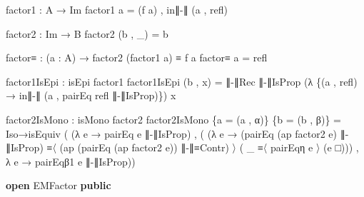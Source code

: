 \documentclass[
  11pt,
  oneside,
  article]{memoir}
\newenvironment{Shaded}{}{}
\newcommand{\KeywordTok}[1]{\textcolor[rgb]{0.00,0.44,0.13}{\textbf{#1}}}
\newcommand{\NormalTok}[1]{#1}
\newcommand{\OtherTok}[1]{\textcolor[rgb]{0.00,0.44,0.13}{#1}}
\theoremstyle{definition}
\theoremstyle{plain}
\newcommand{\0}{\textsf{0}}
\newcommand{\1}{\tn{\textsf{1}}}
\begin{document}
\begin{Shaded}
\begin{Highlighting}[]
\NormalTok{    factor1 }\OtherTok{:}\NormalTok{ A }\OtherTok{→}\NormalTok{ Im}
\NormalTok{    factor1 a }\OtherTok{=} \OtherTok{(}\NormalTok{f a}\OtherTok{)}\NormalTok{ , in∥{-}∥ }\OtherTok{(}\NormalTok{a , refl}\OtherTok{)}

\NormalTok{    factor2 }\OtherTok{:}\NormalTok{ Im }\OtherTok{→}\NormalTok{ B}
\NormalTok{    factor2 }\OtherTok{(}\NormalTok{b , }\OtherTok{\_)} \OtherTok{=}\NormalTok{ b}

\NormalTok{    factor≡ }\OtherTok{:} \OtherTok{(}\NormalTok{a }\OtherTok{:}\NormalTok{ A}\OtherTok{)} \OtherTok{→}\NormalTok{ factor2 }\OtherTok{(}\NormalTok{factor1 a}\OtherTok{)}\NormalTok{ ≡ f a}
\NormalTok{    factor≡ a }\OtherTok{=}\NormalTok{ refl}

\NormalTok{    factor1IsEpi }\OtherTok{:}\NormalTok{ isEpi factor1}
\NormalTok{    factor1IsEpi }\OtherTok{(}\NormalTok{b , x}\OtherTok{)} \OtherTok{=} 
\NormalTok{        ∥{-}∥Rec ∥{-}∥IsProp }
              \OtherTok{(λ} \OtherTok{\{(}\NormalTok{a , refl}\OtherTok{)} \OtherTok{→}\NormalTok{ in∥{-}∥ }\OtherTok{(}\NormalTok{a , pairEq refl ∥{-}∥IsProp}\OtherTok{)\})} 
\NormalTok{              x}

\NormalTok{    factor2IsMono }\OtherTok{:}\NormalTok{ isMono factor2}
\NormalTok{    factor2IsMono }\OtherTok{\{}\NormalTok{a }\OtherTok{=} \OtherTok{(}\NormalTok{a , α}\OtherTok{)\}} \OtherTok{\{}\NormalTok{b }\OtherTok{=} \OtherTok{(}\NormalTok{b , β}\OtherTok{)\}} \OtherTok{=} 
\NormalTok{        Iso→isEquiv }\OtherTok{(} \OtherTok{(λ}\NormalTok{ e }\OtherTok{→}\NormalTok{ pairEq e ∥{-}∥IsProp}\OtherTok{)} 
\NormalTok{                    , }\OtherTok{(} \OtherTok{(λ}\NormalTok{ e }\OtherTok{→} \OtherTok{(}\NormalTok{pairEq }\OtherTok{(}\NormalTok{ap factor2 e}\OtherTok{)}\NormalTok{ ∥{-}∥IsProp}\OtherTok{)} 
\NormalTok{                               ≡〈 }\OtherTok{(}\NormalTok{ap }\OtherTok{(}\NormalTok{pairEq }\OtherTok{(}\NormalTok{ap factor2 e}\OtherTok{))}\NormalTok{ ∥{-}∥≡Contr}\OtherTok{)}\NormalTok{ 〉 }
                               \OtherTok{(} \OtherTok{\_} 
\NormalTok{                               ≡〈 pairEqη e 〉 }
                               \OtherTok{(}\NormalTok{e □}\OtherTok{)))}
\NormalTok{                      , }\OtherTok{λ}\NormalTok{ e }\OtherTok{→}\NormalTok{ pairEqβ1 e ∥{-}∥IsProp}\OtherTok{))}

\KeywordTok{open}\NormalTok{ EMFactor }\KeywordTok{public}
\end{Highlighting}
\end{Shaded}
\end{document}
